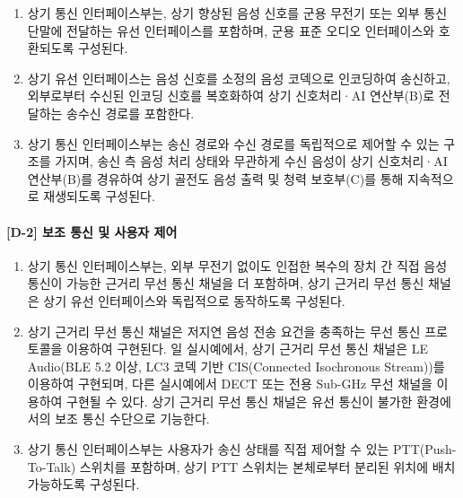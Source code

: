 \documentclass{article}
\begin{document}
\begin{enumerate}[label = \textbf{(D.1.\arabic*)}]

    \item 상기 통신 인터페이스부는, 상기 향상된 음성 신호를
    군용 무전기 또는 외부 통신 단말에 전달하는 유선
    인터페이스를 포함하며, 군용 표준 오디오 인터페이스와
    호환되도록 구성된다.

    \item 상기 유선 인터페이스는 음성 신호를 소정의 음성 코덱으로 인코딩하여 송신하고, 외부로부터 수신된 인코딩 신호를 복호화하여 상기 신호처리·AI 연산부(B)로 전달하는 송수신 경로를 포함한다.

    \item 상기 통신 인터페이스부는 송신 경로와 수신 경로를 독립적으로 제어할 수 있는 구조를 가지며, 송신 측 음성 처리 상태와 무관하게 수신 음성이 상기 신호처리·AI 연산부(B)를 경유하여 상기 골전도 음성 출력 및 청력 보호부(C)를 통해 지속적으로 재생되도록 구성된다.

\end{enumerate}


\paragraph{[D-2] 보조 통신 및 사용자 제어}

\begin{enumerate}[label = \textbf{(D.2.\arabic*)}]

    \item 상기 통신 인터페이스부는, 외부 무전기 없이도
    인접한 복수의 장치 간 직접 음성 통신이 가능한 근거리
    무선 통신 채널을 더 포함하며, 상기 근거리 무선 통신
    채널은 상기 유선 인터페이스와 독립적으로 동작하도록
    구성된다.

    \item 상기 근거리 무선 통신 채널은 저지연 음성 전송
    요건을 충족하는 무선 통신 프로토콜을 이용하여 구현된다.
    일 실시예에서, 상기 근거리 무선 통신 채널은 LE Audio(BLE 5.2 이상, LC3 코덱 기반 CIS(Connected Isochronous Stream))를 이용하여 구현되며, 다른 실시예에서 DECT 또는 전용 Sub-GHz 무선 채널을 이용하여 구현될 수 있다. 상기 근거리 무선 통신 채널은 유선 통신이 불가한 환경에서의 보조 통신
    수단으로 기능한다.

    \item 상기 통신 인터페이스부는 사용자가 송신 상태를
    직접 제어할 수 있는 PTT(Push-To-Talk) 스위치를
    포함하며, 상기 PTT 스위치는 본체로부터 분리된
    위치에 배치 가능하도록 구성된다.

\end{enumerate}
\end{document}
